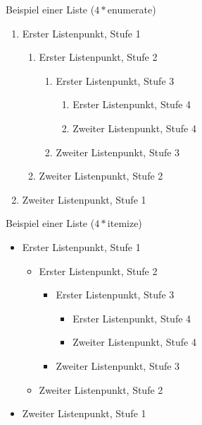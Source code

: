 \documentclass[%
,full
,color
,Ausgabe=4
]{dtk2}
\begin{document}
\maketitle

Beispiel einer Liste ($4*$enumerate)

\begin{enumerate}
  \item Erster Listenpunkt, Stufe 1
  \begin{enumerate}
    \item Erster Listenpunkt, Stufe 2
    \begin{enumerate}
      \item Erster Listenpunkt, Stufe 3
      \begin{enumerate}
        \item Erster Listenpunkt, Stufe 4
        \item Zweiter Listenpunkt, Stufe 4
      \end{enumerate}
      \item Zweiter Listenpunkt, Stufe 3
    \end{enumerate}
    \item Zweiter Listenpunkt, Stufe 2
  \end{enumerate}
  \item Zweiter Listenpunkt, Stufe 1
\end{enumerate}

Beispiel einer Liste ($4*$itemize)

\begin{itemize}
  \item Erster Listenpunkt, Stufe 1
  \begin{itemize}
    \item Erster Listenpunkt, Stufe 2
    \begin{itemize}
      \item Erster Listenpunkt, Stufe 3
      \begin{itemize}
        \item Erster Listenpunkt, Stufe 4
        \item Zweiter Listenpunkt, Stufe 4
      \end{itemize}
      \item Zweiter Listenpunkt, Stufe 3
    \end{itemize}
    \item Zweiter Listenpunkt, Stufe 2
  \end{itemize}
  \item Zweiter Listenpunkt, Stufe 1
\end{itemize}
\end{document}
